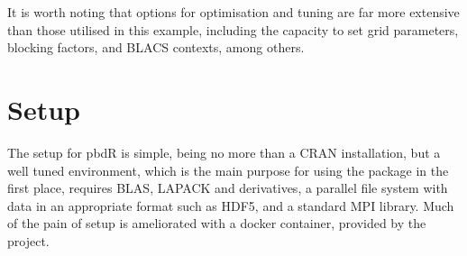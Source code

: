 \documentclass[a4paper]{article}
\begin{document}
It is worth noting that options for optimisation and tuning are far more
extensive than those utilised in this example, including the capacity to set
grid parameters, blocking factors, and BLACS contexts, among others.

\section{Setup}

The setup for pbdR is simple, being no more than a CRAN installation, but a
well tuned environment, which is the main purpose for using the package in the
first place, requires BLAS, LAPACK and derivatives, a parallel file system with
data in an appropriate format such as HDF5, and a standard MPI library. Much of
the pain of setup is ameliorated with a docker container, provided by the
project.

\printbibliography{}
\end{document}
